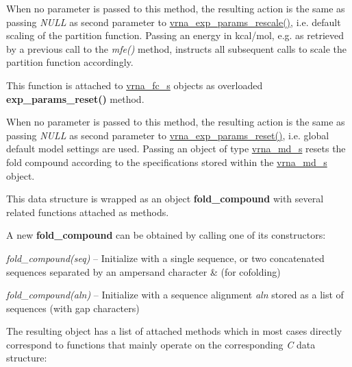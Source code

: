 \begin{DoxyRefList}
When no parameter is passed to this method, the resulting action is the same as passing {\itshape N\+U\+LL} as second parameter to \mbox{\hyperlink{group__energy__parameters_gad607bc3a5b5da16400e2ca4ea5560233}{vrna\+\_\+exp\+\_\+params\+\_\+rescale()}}, i.\+e. default scaling of the partition function. Passing an energy in kcal/mol, e.\+g. as retrieved by a previous call to the {\itshape mfe()} method, instructs all subsequent calls to scale the partition function accordingly.  
\item[\label{wrappers__wrappers000046}%
\Hypertarget{wrappers__wrappers000046}%
Global \mbox{\hyperlink{group__energy__parameters_gaa5409218068be84d7b50c78fbdaa85a9}{vrna\+\_\+exp\+\_\+params\+\_\+reset}} (vrna\+\_\+fold\+\_\+compound\+\_\+t $\ast$vc, vrna\+\_\+md\+\_\+t $\ast$md\+\_\+p)]This function is attached to \mbox{\hyperlink{group__fold__compound_structvrna__fc__s}{vrna\+\_\+fc\+\_\+s}} objects as overloaded {\bfseries exp\+\_\+params\+\_\+reset()} method.

When no parameter is passed to this method, the resulting action is the same as passing {\itshape N\+U\+LL} as second parameter to \mbox{\hyperlink{group__energy__parameters_gaa5409218068be84d7b50c78fbdaa85a9}{vrna\+\_\+exp\+\_\+params\+\_\+reset()}}, i.\+e. global default model settings are used. Passing an object of type \mbox{\hyperlink{structvrna__md__s}{vrna\+\_\+md\+\_\+s}} resets the fold compound according to the specifications stored within the \mbox{\hyperlink{structvrna__md__s}{vrna\+\_\+md\+\_\+s}} object.  
\item[\label{wrappers__wrappers000032}%
\Hypertarget{wrappers__wrappers000032}%
Class \mbox{\hyperlink{group__fold__compound}{vrna\+\_\+fc\+\_\+s}} ]

This data structure is wrapped as an object {\bfseries fold\+\_\+compound} with several related functions attached as methods.

A new {\bfseries fold\+\_\+compound} can be obtained by calling one of its constructors\+:~\newline

\begin{DoxyItemize}
\item {\itshape fold\+\_\+compound(seq)} -- Initialize with a single sequence, or two concatenated sequences separated by an ampersand character \textquotesingle{}\&\textquotesingle{} (for cofolding)
\item {\itshape fold\+\_\+compound(aln)} -- Initialize with a sequence alignment {\itshape aln} stored as a list of sequences (with gap characters)
\end{DoxyItemize}The resulting object has a list of attached methods which in most cases directly correspond to functions that mainly operate on the corresponding {\itshape C} data structure\+:~\newline


\end{DoxyRefList}
